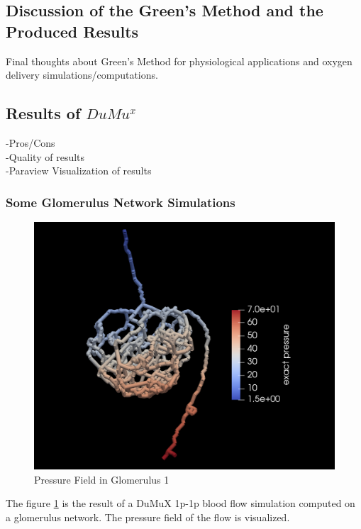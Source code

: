 \subsection{Discussion of the Green's Method and the Produced Results}

Final thoughts about Green's Method for physiological applications and oxygen delivery simulations/computations.


\subsection{Results of $DuMu^x$} 
-Pros/Cons
\\-Quality of results
\\-Paraview Visualization of results

\newpage
\subsubsection*{Some Glomerulus Network Simulations}

\begin{figure}[h]
\centering
\includegraphics[width=162mm]{nephron_pressure}
\caption{Pressure Field in Glomerulus 1}
\label{fig:nephron_pressure}
\end{figure}
The figure \ref{fig:nephron_pressure} is the result of a DuMuX 1p-1p blood flow simulation computed on a glomerulus network. The pressure field of the flow is visualized.\\

